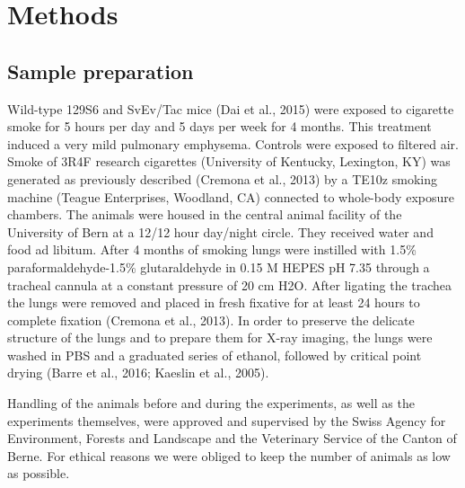 \section{Methods}\label{sec:methods}
\subsection{Sample preparation}
Wild-type 129S6 and SvEv/Tac mice \cite{Dai_2015}(Dai et al., 2015) were exposed to cigarette smoke for 5 hours per day and 5 days per week for 4 months. This treatment induced a very mild pulmonary emphysema. Controls were exposed to filtered air. Smoke of 3R4F research cigarettes (University of Kentucky, Lexington, KY) was generated as previously described (Cremona et al., 2013) by a TE10z smoking machine (Teague Enterprises, Woodland, CA) connected to whole-body exposure chambers. The animals were housed in the central animal facility of the University of Bern at a 12/12 hour day/night circle. They received water and food ad libitum. After 4 months of smoking lungs were instilled with 1.5\% paraformaldehyde-1.5\% glutaraldehyde in 0.15 M HEPES pH 7.35 through a tracheal cannula at a constant pressure of 20 cm H2O. After ligating the trachea the lungs were removed and placed in fresh fixative for at least 24 hours to complete fixation (Cremona et al., 2013). In order to preserve the delicate structure of the lungs and to prepare them for X-ray imaging, the lungs were washed in PBS and a graduated series of ethanol, followed by critical point drying (Barre et al., 2016; Kaeslin et al., 2005).

Handling of the animals before and during the experiments, as well as the experiments themselves, were approved and supervised by the Swiss Agency for Environment, Forests and Landscape and the Veterinary Service of the Canton of Berne. For ethical reasons we were obliged to keep the number of animals as low as possible.

